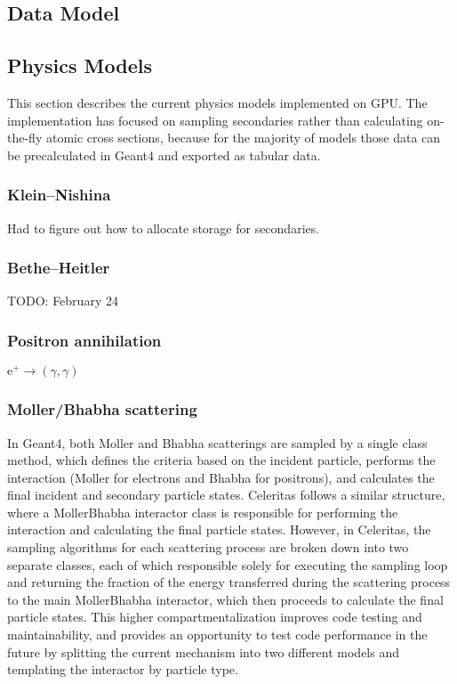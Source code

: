 \documentclass{webofc}
\begin{document}
\subsection{Data Model}
\label{sec:data-model}

\subsection{Physics Models}
\label{sec:physics-models}

This section describes the current physics models implemented on GPU. The
implementation has focused on sampling secondaries rather than calculating
on-the-fly atomic cross sections, because for the majority of models those data
can be precalculated in Geant4 and exported as tabular data.

\subsubsection{Klein--Nishina}

Had to figure out how to allocate storage for secondaries.

\subsubsection{Bethe--Heitler}

TODO: February 24

\subsubsection{Positron annihilation}

$\textrm{e}^+ \to (\gamma, \gamma)$

\subsubsection{Moller/Bhabha scattering}

In Geant4, both Moller and Bhabha scatterings are sampled by a single
class method, which defines the criteria based on the incident particle,
performs the interaction (Moller for electrons and Bhabha for positrons), and
calculates the final incident and secondary particle states. Celeritas
follows a similar structure, where a MollerBhabha interactor class is
responsible for performing the interaction and calculating the final particle
states. However, in Celeritas, the sampling algorithms for each scattering
process are broken down into two separate classes, each of which responsible
solely for executing the sampling loop and returning the fraction of the energy
transferred during the scattering process to the main MollerBhabha interactor,
which then proceeds to calculate the final particle states. This higher
compartmentalization improves code testing and maintainability, and provides
an opportunity to test code performance in the future by splitting the current
mechanism into two different models and templating the interactor by particle
type.
\end{document}
